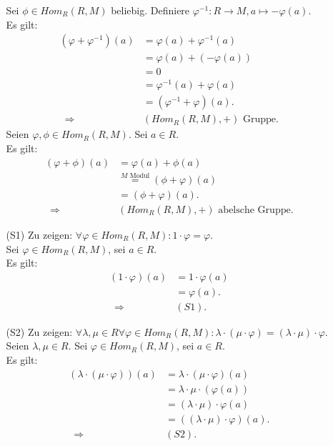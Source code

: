 \documentclass[12pt]{article}
\newcommand{\df}{\enspace\Longrightarrow\enspace}
\newcommand{\homr}{Hom_R(R,M)}
\begin{document}
\begin{enumerate}
\begin{enumerate}
		Sei $\phi\in\homr$ beliebig. Definiere $\varphi^{-1}:R\rightarrow M,a\mapsto-\varphi(a).$ \\
		Es gilt:
		\begin{align*}
			(\varphi+\varphi^{-1})(a)&=\varphi(a)+\varphi^{-1}(a) \\
			&=\varphi(a)+(-\varphi(a)) \\
			&=0 \\
			&=\varphi^{-1}(a)+\varphi(a) \\
			&=(\varphi^{-1}+\varphi)(a). \\
			\df&(\homr,+)\text{ Gruppe}.
		\end{align*}
		Seien $\varphi,\phi\in\homr$. Sei $a\in R$. \\
		Es gilt:
		\begin{align*}
			(\varphi+\phi)(a)&=\varphi(a)+\phi(a) \\
			&\overset{M\text{ Modul}}{=}(\phi+\varphi)(a) \\
			&=(\phi+\varphi)(a). \\
			\df&(\homr,+)\text{ abelsche Gruppe}.
		\end{align*}
		
		\item[(S1)] Zu zeigen: $\forall\varphi\in\homr:1\cdot\varphi=\varphi$. \\
		Sei $\varphi\in\homr$, sei $a\in R$. \\
		Es gilt:
		\begin{align*}
			(1\cdot\varphi)(a)&=1\cdot\varphi(a) \\
			&=\varphi(a). \\
			\df&(S1).
		\end{align*}
		
		\item[(S2)] Zu zeigen: $\forall\lambda,\mu\in R\forall\varphi\in\homr:\lambda\cdot(\mu\cdot\varphi)=(\lambda\cdot\mu)\cdot\varphi$. \\
		Seien $\lambda,\mu\in R$. Sei $\varphi\in\homr$, sei $a\in R$. \\
		Es gilt:
		\begin{align*}
			(\lambda\cdot(\mu\cdot\varphi))(a)&=\lambda\cdot(\mu\cdot\varphi)(a) \\
			&=\lambda\cdot\mu\cdot(\varphi(a)) \\
			&=(\lambda\cdot\mu)\cdot\varphi(a) \\
			&=((\lambda\cdot\mu)\cdot\varphi)(a). \\
			\df&(S2).
		\end{align*}
		

\end{enumerate}
\end{enumerate}
\end{document}
